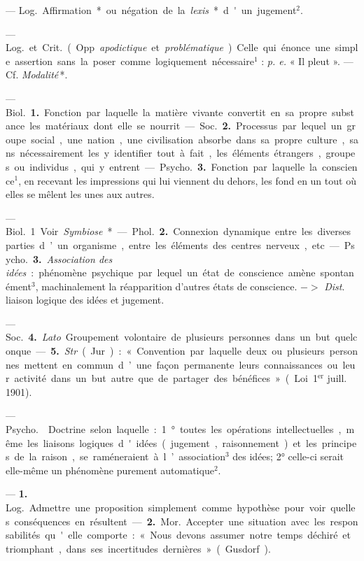 \begin{itemize}[leftmargin=1cm, label=, itemsep=1pt]
{{ — \si{Log.} Affirmation* ou
négation de la {\it lexis}* d'un jugement$^2$.

 — \si{Log.}
et \si{Crit.} (Opp. {\it apodictique} et {\it problématique}). Celle qui énonce une
simple assertion sans la poser comme
logiquement nécessaire$^1$ : {\it p. e.} « Il
pleut ». — Cf.  {\it Modalité}\,*.


 — \si{Biol.} {\bf 1.} Fonction
par laquelle la matière vivante convertit en sa propre substance les
matériaux dont elle se nourrit.

— \si{Soc.} {\bf 2.} Processus par lequel un
groupe social, une nation, une civilisation absorbe dans sa propre
culture, sans nécessairement les y identifier tout à fait,
les éléments étrangers, groupes ou individus, qui y
entrent.

— \si{Psycho.} {\bf 3.} Fonction par laquelle la conscience$^1$, en recevant
les impressions qui lui viennent du
dehors, les fond en un tout où elles
se mêlent les unes aux autres.


 — \si{Biol.} 1 Voir {\it Symbiose}*.

— \si{Phol.} {\bf 2.} Connexion dynamique
entre les diverses parties d’un organisme, entre les éléments des centres
nerveux, etc.

— \si{Psycho.} {\bf 3.} {\it Association des
idées} : phénomène psychique par
lequel un état de conscience amène
spontanément$^3$, machinalement la
réapparition d’autres états de conscience. $->$ {\it Dist}. liaison logique
des idées et jugement.

— \si{Soc.} {\bf 4.} {\it Lato}. Groupement
volontaire de plusieurs personnes
dans un but quelconque. — {\bf 5.} {\it Str}.
(Jur.) : « Convention par laquelle
deux ou plusieurs personnes mettent
en commun d’une façon permanente
leurs connaissances ou leur activité
dans un but autre que de partager
des bénéfices ». (Loi 1$^\text{er}$ juill. 1901).

 — \si{Psycho.}  Doctrine selon laquelle : 1° toutes les
opérations intellectuelles, même les
liaisons logiques d'idées (jugement,
raisonnement) et les principes de la
raison, se raméneraient à l’association$^3$ des idées; 2° celle-ci serait
elle-même un phénomène purement
automatique$^2$.

 — {\bf 1.} \si{Log.} Admettre une
proposition simplement comme hypothèse pour voir quelles
conséquences en résultent.

— {\bf 2.} \si{Mor.} Accepter une situation avec les responsabilités qu'elle
comporte : « Nous devons assumer
notre temps déchiré et triomphant,
dans ses incertitudes dernières »
(Gusdorf).

}}
\end{itemize}
